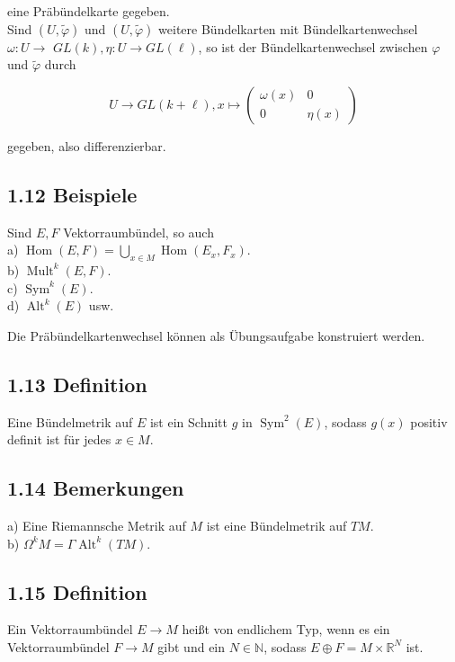 \documentclass[10pt, letterpaper]{article}
\begin{document}
eine Präbündelkarte gegeben.\\
Sind $(U, \tilde{\varphi})$ und $(U, \tilde{\varphi})$ weitere Bündelkarten mit Bündelkartenwechsel $\omega: U \rightarrow$ $G L(k), \eta: U \rightarrow G L(\ell)$, so ist der Bündelkartenwechsel zwischen $\varphi$ und $\tilde{\varphi}$ durch

$$
U \rightarrow G L(k+\ell), x \mapsto\left(\begin{array}{cc}
\omega(x) & 0 \\
0 & \eta(x)
\end{array}\right)
$$

gegeben, also differenzierbar.

\subsection*{1.12 Beispiele}
Sind $E, F$ Vektorraumbündel, so auch\\
a) $\operatorname{Hom}(E, F)=\bigcup_{x \in M} \operatorname{Hom}\left(E_{x}, F_{x}\right)$.\\
b) $\operatorname{Mult}^{k}(E, F)$.\\
c) $\operatorname{Sym}^{k}(E)$.\\
d) $\operatorname{Alt}^{k}(E)$ usw.

Die Präbündelkartenwechsel können als Übungsaufgabe konstruiert werden.

\subsection*{1.13 Definition}
Eine Bündelmetrik auf $E$ ist ein Schnitt $g$ in $\operatorname{Sym}^{2}(E)$, sodass $g(x)$ positiv definit ist für jedes $x \in M$.

\subsection*{1.14 Bemerkungen}
a) Eine Riemannsche Metrik auf $M$ ist eine Bündelmetrik auf $T M$.\\
b) $\Omega^{k} M=\Gamma \operatorname{Alt}^{k}(T M)$.

\subsection*{1.15 Definition}
Ein Vektorraumbündel $E \rightarrow M$ heißt von endlichem Typ, wenn es ein Vektorraumbündel $F \rightarrow M$ gibt und ein $N \in \mathbb{N}$, sodass $E \oplus F=M \times \mathbb{R}^{N}$ ist.
\end{document}
